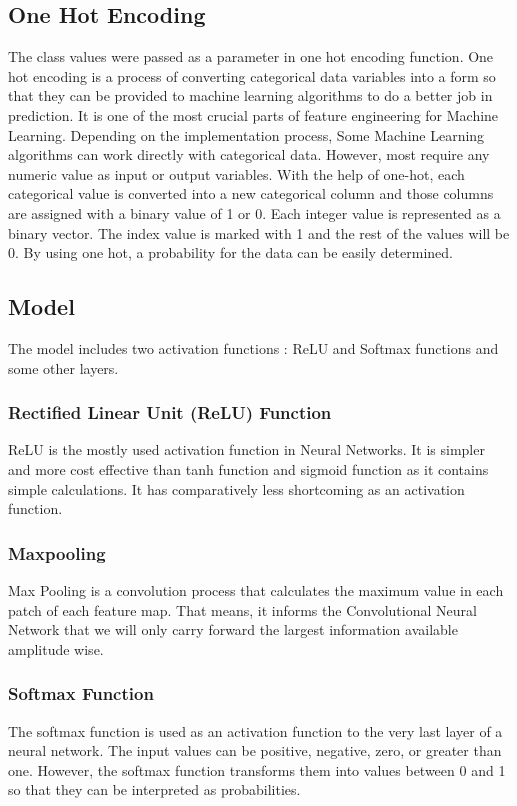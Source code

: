 \documentclass[conference]{IEEEtran}
\begin{document}
\subsection{One Hot Encoding}
The class values were passed as a parameter in one hot encoding function. One hot encoding is a process of converting categorical data variables into a form so that they can be provided to machine learning algorithms to do a better job in prediction. It is one of the most crucial parts of feature engineering for Machine Learning.  Depending on the implementation process, Some Machine Learning algorithms can work directly with categorical data. However, most require any numeric value as  input or output variables. With the help of one-hot, each categorical value is converted into a new categorical column and those columns are  assigned with a binary value of 1 or 0. Each integer value is represented as a binary vector.  The index value is marked with 1 and the rest of the values will be 0. By using one hot, a probability for the data can be easily determined. 
\subsection{Model}
The model includes two activation functions : ReLU and Softmax functions and some other layers.
\subsubsection{Rectified Linear Unit (ReLU) Function}
ReLU is the mostly used activation function in Neural Networks. It is simpler and more cost effective than tanh function and sigmoid function as it contains simple calculations. It has comparatively less shortcoming as an activation function.
\subsubsection{Maxpooling}
Max Pooling is a convolution process that calculates the maximum value in each patch of each feature map. That means, it informs the  Convolutional Neural Network that we will only carry forward the largest information available amplitude wise.
\subsubsection{Softmax Function}
The softmax function is used as an activation function to the very last layer of a neural network. The input values can be positive, negative, zero, or greater than one. However, the softmax function transforms them into values between 0 and 1 so that they can be interpreted as probabilities.
\end{document}
